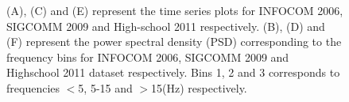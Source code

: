 \begin{figure}[!ht]
  
  
  
  
  
  
  

  
  
   \caption{\label{fig_all_dataset} (A), (C) and (E) represent the time series plots for INFOCOM 2006, SIGCOMM 2009 and High-school 2011 respectively. (B), (D) and (F) represent the power spectral density (PSD) corresponding to the frequency bins for INFOCOM 2006, SIGCOMM 2009 and Highschool 2011 dataset respectively. Bins 1, 2 and 3 corresponds to frequencies $<$5, 5-15 and $>$15(Hz) respectively.}
%   
 \end{figure}

